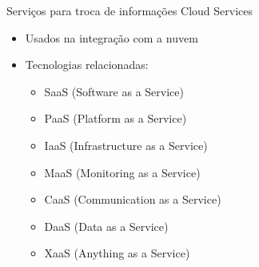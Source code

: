\documentclass[t]{beamer}
\begin{document}
\begin{frame}{Serviços para troca de informações}
Cloud Services
\begin{itemize}
	\item Usados na integração com a nuvem
	\item Tecnologias relacionadas:
	\begin{itemize}
		\item SaaS (Software as a Service)
		\item PaaS (Platform as a Service)
		\item IaaS (Infrastructure as a Service)
		\item MaaS (Monitoring as a Service)
		\item CaaS (Communication as a Service)
		\item DaaS (Data as a Service)
		\item XaaS (Anything as a Service)
	\end{itemize}	
\end{itemize}
\end{frame}
\end{document}
